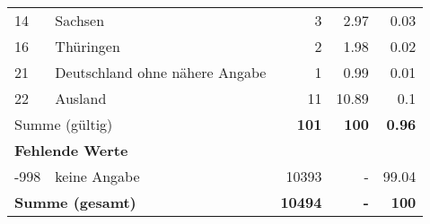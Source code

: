 \begin{longtable}{lXrrr}
     14 &
     \multicolumn{1}{X}{ Sachsen   } &


       \num{3} &
       \num[round-mode=places,round-precision=2]{2.97} &
         \num[round-mode=places,round-precision=2]{0.03} \\

     16 &
     \multicolumn{1}{X}{ Thüringen   } &


       \num{2} &
       \num[round-mode=places,round-precision=2]{1.98} &
         \num[round-mode=places,round-precision=2]{0.02} \\

     21 &
     \multicolumn{1}{X}{ Deutschland ohne nähere Angabe   } &


       \num{1} &
       \num[round-mode=places,round-precision=2]{0.99} &
         \num[round-mode=places,round-precision=2]{0.01} \\

     22 &
     \multicolumn{1}{X}{ Ausland   } &


       \num{11} &
       \num[round-mode=places,round-precision=2]{10.89} &
         \num[round-mode=places,round-precision=2]{0.1} \\
     \midrule
     \multicolumn{2}{l}{Summe (gültig)} &
       \textbf{\num{101}} &
     \textbf{\num{100}} &
       \textbf{\num[round-mode=places,round-precision=2]{0.96}} \\
     \multicolumn{5}{l}{\textbf{Fehlende Werte}}\\
       -998 &
       keine Angabe &
         \num{10393} &
        - &
         \num[round-mode=places,round-precision=2]{99.04} \\
     \midrule
     \multicolumn{2}{l}{\textbf{Summe (gesamt)}} &
          \textbf{\num{10494}} &
        \textbf{-} &
        \textbf{\num{100}} \\
     \bottomrule
     \end{longtable}
     
